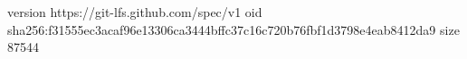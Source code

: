 version https://git-lfs.github.com/spec/v1
oid sha256:f31555ec3acaf96e13306ca3444bffc37c16c720b76fbf1d3798e4eab8412da9
size 87544
